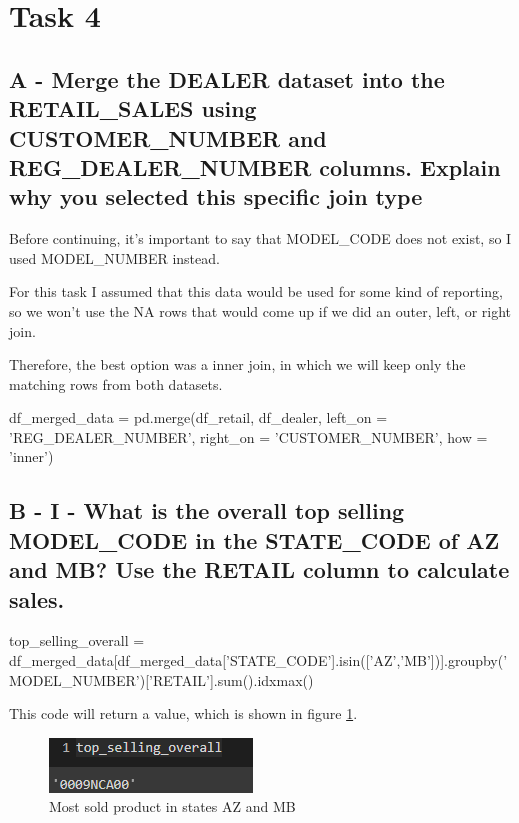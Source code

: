\documentclass[a4paper, 12pt]{article}
\begin{document}
\section{Task 4}

\subsection{A - Merge the DEALER dataset into the RETAIL\_SALES using CUSTOMER\_NUMBER and REG\_DEALER\_NUMBER columns. Explain why you selected this specific join type}

Before continuing, it's important to say that MODEL\_CODE does not exist, so I used MODEL\_NUMBER instead.

For this task I assumed that this data would be used for some kind of reporting, so we won't use the NA rows that would come up if we did an outer, left, or right join.

Therefore, the best option was a inner join, in which we will keep only the matching rows from both datasets.

\begin{python}
	df_merged_data = pd.merge(df_retail, df_dealer, left_on = 'REG_DEALER_NUMBER', right_on = 'CUSTOMER_NUMBER', how = 'inner')
\end{python}

\subsection{B - I - What is the overall top selling MODEL\_CODE in the STATE\_CODE of AZ and MB? Use the RETAIL column to calculate sales.}

\begin{python}
	top_selling_overall = df_merged_data[df_merged_data['STATE_CODE'].isin(['AZ','MB'])].groupby('MODEL_NUMBER')['RETAIL'].sum().idxmax()
\end{python}

This code will return a value, which is shown in figure \ref{img_7}.

\begin{figure}[!htb]
	\caption{\label{img_7} Most sold product in states AZ and MB}
	\begin{center}
		\includegraphics[scale=1.1]{img_07.PNG}
	\end{center}
\end{figure}
\end{document}
